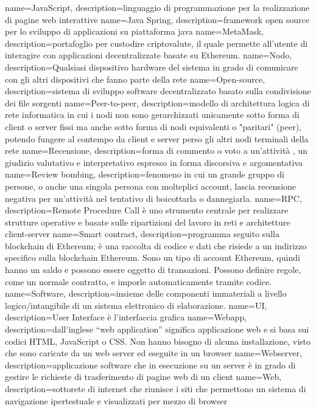  { name={JavaScript}, description={linguaggio di programmazione per la realizzazione di pagine web interattive} }
 { name={Java Spring}, description={framework open source per lo sviluppo di applicazioni su piattaforma java} }
 { name={MetaMask}, description={portafoglio per custodire criptovalute, il quale permette all'utente di interagire con applicazioni decentralizzate basate su Ethereum.} }
 { name={Nodo}, description={Qualsiasi dispositivo hardware del sistema in grado di comunicare con gli altri dispositivi che fanno parte della rete} }
 { name={Open-source}, description={sistema di sviluppo software decentralizzato basato sulla condivisione dei file sorgenti} }
 { name={Peer-to-peer}, description={modello di architettura logica di rete informatica in cui i nodi non sono gerarchizzati unicamente sotto forma di client o server fissi ma anche sotto forma di nodi equivalenti o "paritari" (peer), potendo fungere al contempo da client e server perso gli altri nodi terminali della rete} }
 { name={Recensione}, description={forma di commento o voto a un'attività , un giudizio valutativo e interpretativo espresso in forma discorsiva e argomentativa} }
 { name={Review bombing}, description={fenomeno in cui un grande gruppo di persone, o anche una singola persona con molteplici account, lascia recensione negativa per un'attività nel tentativo di boicottarla o dannegiarla.} }
 { name={RPC}, description={Remote Procedure Call è uno strumento centrale per realizzare strutture operative e basate sulle ripartizioni del lavoro in reti e architetture client-server} }
 { name={Smart contract}, description={programma seguito sulla blockchain di Ethereum; è una raccolta di codice e dati che risiede a un indirizzo specifico sulla blockchain Ethereum. Sono un tipo di account Ethereum, quindi hanno un saldo e possono essere oggetto di transazioni. Possono definire regole, come un normale contratto, e imporle automaticamente tramite codice.} }
 { name={Software}, description={insieme delle componenti immateriali a livello logico/intangibile di un sistema elettronico di elaborazione.} }
 { name={UI}, description={User Interface è l'interfaccia grafica} }
 { name={Webapp}, description={dall'inglese “web application” significa applicazione web e si basa sui codici HTML, JavaScript o CSS. Non hanno bisogno di alcuna installazione, visto che sono caricate da un web server ed eseguite in un browser} }
 { name={Webserver}, description={applicazione software che in esecuzione su un server è in grado di gestire le richieste di trasferimento di pagine web di un client} }
 { name={Web}, description={sottorete di internet che riunisce i siti che permettono un sistema di navigazione ipertestuale e visualizzati per mezzo di browser} }
